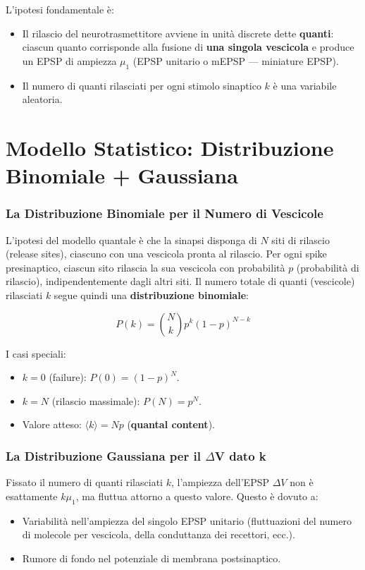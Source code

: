 L'ipotesi fondamentale è:
\begin{itemize}
    \item Il rilascio del neurotrasmettitore avviene in unità discrete dette \textbf{quanti}: ciascun quanto corrisponde alla fusione di \textbf{una singola vescicola} e produce un EPSP di ampiezza $\mu_1$ (EPSP unitario o mEPSP — miniature EPSP).
    \item Il numero di quanti rilasciati per ogni stimolo sinaptico $k$ è una variabile aleatoria.
\end{itemize}



\section{Modello Statistico: Distribuzione Binomiale + Gaussiana}

\subsubsection{La Distribuzione Binomiale per il Numero di Vescicole}

L'ipotesi del modello quantale è che la sinapsi disponga di $N$ siti di rilascio (release sites), ciascuno con una vescicola pronta al rilascio. Per ogni spike presinaptico, ciascun sito rilascia la sua vescicola con probabilità $p$ (probabilità di rilascio), indipendentemente dagli altri siti. Il numero totale di quanti (vescicole) rilasciati $k$ segue quindi una \textbf{distribuzione binomiale}:

\begin{equation}
P(k) = \binom{N}{k} p^k (1-p)^{N-k}
\end{equation}

I casi speciali:
\begin{itemize}
    \item $k = 0$ (failure): $P(0) = (1-p)^N$.
    \item $k = N$ (rilascio massimale): $P(N) = p^N$.
    \item Valore atteso: $\langle k \rangle = Np$ (\textbf{quantal content}).
\end{itemize}

\subsubsection{La Distribuzione Gaussiana per il $\Delta$V dato k}

Fissato il numero di quanti rilasciati $k$, l'ampiezza dell'EPSP $\Delta V$ non è esattamente $k \mu_1$, ma fluttua attorno a questo valore. Questo è dovuto a:
\begin{itemize}
    \item Variabilità nell'ampiezza del singolo EPSP unitario (fluttuazioni del numero di molecole per vescicola, della conduttanza dei recettori, ecc.).
    \item Rumore di fondo nel potenziale di membrana postsinaptico.
\end{itemize}

